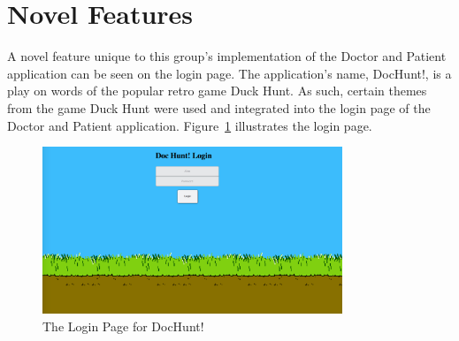 \documentclass{article}
\begin{document}
\section{Novel Features}
A novel feature unique to this group's implementation of the Doctor and Patient application can be seen on the login page. The application's name, DocHunt!, is a play on words of the popular retro game Duck Hunt. As such, certain themes from the game Duck Hunt were used and integrated into the login page of the Doctor and Patient application. Figure~\ref{fig:docHuntLogin} illustrates the login page.
\begin{figure}[H]
	\centering
	\includegraphics[width=0.8\textwidth]{"res/image/DocHunt Login Page"}
	\caption{The Login Page for DocHunt!}
	\label{fig:docHuntLogin}
\end{figure}
\end{document}
